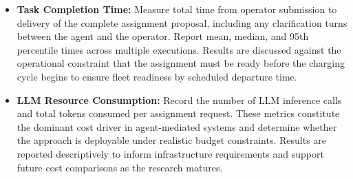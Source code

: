 \begin{itemize}
    \item \textbf{Task Completion Time:} %
    Measure total time from operator submission to delivery of the complete assignment proposal,
        including any clarification turns between the agent and the operator.
    Report mean, median, and 95th percentile times across multiple executions.
    Results are discussed against the operational constraint that the assignment must be
        ready before the charging cycle begins to ensure fleet readiness by scheduled
        departure time.

    \item \textbf{LLM Resource Consumption:} %
    Record the number of LLM inference calls and total tokens consumed
        per assignment request.
    These metrics constitute the dominant cost driver in agent-mediated systems
        and determine whether the approach is deployable under realistic budget constraints.
    Results are reported descriptively to inform infrastructure requirements
        and support future cost comparisons as the research matures.
\end{itemize}
